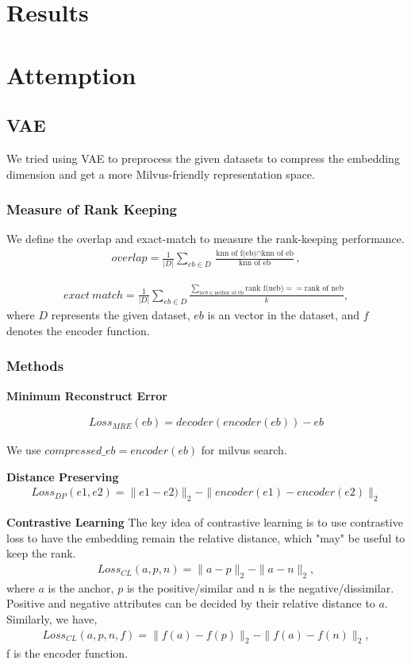 \documentclass{ol-softwaremanual}
\begin{document}
\section{Results}


\section{Attemption}
\subsection{VAE}


We tried using VAE to preprocess the given datasets to compress the embedding dimension and get a more Milvus-friendly representation space.


\subsubsection{Measure of Rank Keeping}
We define the overlap and exact-match to measure the rank-keeping performance.
\begin{align}
    overlap = \frac{1}{|D|} \sum_{eb \in D} \frac{\text{knn of f(eb)} \cap \text{knn of eb}}{\text{knn of eb}},
\end{align}

\begin{align}
    exact~match = \frac{1}{|D|} \sum_{eb \in D}  \frac{\sum_{neb\in \text{neibor of eb}}\text{rank f(neb)} == \text{rank of neb}}{k},
\end{align}
where $D$ represents the given dataset, $eb$ is an vector in the dataset, and $f$ denotes the encoder function.

\subsubsection{Methods}

\textbf{Minimum Reconstruct Error}

\begin{align}
    Loss_{MRE}(eb) = decoder(encoder(eb)) - eb
\end{align}

We use $compressed\_eb = encoder(eb)$ for milvus search.

\textbf{Distance Preserving}
\begin{align}
    Loss_{DP}(e1, e2) = \|e1 - e2)\|_2 - \|encoder(e1) - encoder(e2)\|_2
\end{align}

\textbf{Contrastive Learning}
The key idea of contrastive learning is to use contrastive loss to have the embedding remain the relative distance, which "may" be useful to keep the rank.
\begin{align}
    Loss_{CL}(a, p, n) = \|a - p\|_2 - \|a-n\|_2,
\end{align}
where $a$ is the anchor, $p$ is the positive/similar and n is the negative/dissimilar. Positive and negative attributes can be decided by their relative distance to $a$. Similarly, we have,
\begin{align}
    Loss_{CL}(a, p, n ,f) = \|f(a) - f(p)\|_2 - \|f(a)-f(n)\|_2,
\end{align}
f is the encoder function.
\end{document}
